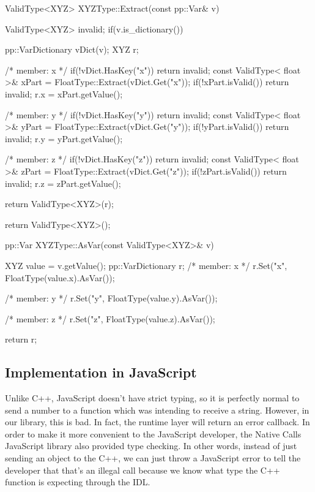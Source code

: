 \begin{code}
ValidType<XYZ> XYZType::Extract(const pp::Var& v){
  ValidType<XYZ> invalid;
  if(v.is_dictionary()){
    pp::VarDictionary vDict(v);
    XYZ r;

    /* member: x */
    if(!vDict.HasKey("x")) return invalid;
    const ValidType< float >& xPart = FloatType::Extract(vDict.Get("x"));
    if(!xPart.isValid()) return invalid;
    r.x = xPart.getValue();

    /* member: y */
    if(!vDict.HasKey("y")) return invalid;
    const ValidType< float >& yPart = FloatType::Extract(vDict.Get("y"));
    if(!yPart.isValid()) return invalid;
    r.y = yPart.getValue();

    /* member: z */
    if(!vDict.HasKey("z")) return invalid;
    const ValidType< float >& zPart = FloatType::Extract(vDict.Get("z"));
    if(!zPart.isValid()) return invalid;
    r.z = zPart.getValue();


    return ValidType<XYZ>(r);
  }
  return ValidType<XYZ>();
}

pp::Var XYZType::AsVar(const ValidType<XYZ>& v){
  XYZ value = v.getValue();
  pp::VarDictionary r;
  /* member: x */
  r.Set("x", FloatType(value.x).AsVar());

  /* member: y */
  r.Set("y", FloatType(value.y).AsVar());

  /* member: z */
  r.Set("z", FloatType(value.z).AsVar());

  return r;
}
\end{code}


\subsection{Implementation in JavaScript} %
\label{sub:webidl_implementation_in_javascript}
Unlike C++, JavaScript doesn't have strict typing, so it is perfectly normal to send a number to a function which was intending to receive a string. However, in our library, this is bad. In fact, the runtime layer will return an error callback. In order to make it more convenient to the JavaScript developer, the Native Calls JavaScript library also provided type checking. In other words, instead of just sending an object to the C++, we can just throw a JavaScript error to tell the developer that that's an illegal call because we know what type the C++ function is expecting through the IDL.

